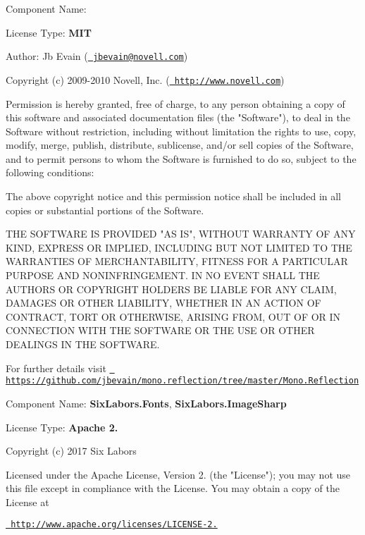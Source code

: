 

Component Name\+: {\bfseries{}}

License Type\+: {\bfseries{MIT}}

Author\+: Jb Evain (\href{mailto:jbevain@novell.com}{\texttt{ jbevain@novell.\+com}})

Copyright (c) 2009-\/2010 Novell, Inc. (\href{http://www.novell.com}{\texttt{ http\+://www.\+novell.\+com}})

Permission is hereby granted, free of charge, to any person obtaining a copy of this software and associated documentation files (the "{}\+Software"{}), to deal in the Software without restriction, including without limitation the rights to use, copy, modify, merge, publish, distribute, sublicense, and/or sell copies of the Software, and to permit persons to whom the Software is furnished to do so, subject to the following conditions\+:

The above copyright notice and this permission notice shall be included in all copies or substantial portions of the Software.

THE SOFTWARE IS PROVIDED "{}\+AS IS"{}, WITHOUT WARRANTY OF ANY KIND, EXPRESS OR IMPLIED, INCLUDING BUT NOT LIMITED TO THE WARRANTIES OF MERCHANTABILITY, FITNESS FOR A PARTICULAR PURPOSE AND NONINFRINGEMENT. IN NO EVENT SHALL THE AUTHORS OR COPYRIGHT HOLDERS BE LIABLE FOR ANY CLAIM, DAMAGES OR OTHER LIABILITY, WHETHER IN AN ACTION OF CONTRACT, TORT OR OTHERWISE, ARISING FROM, OUT OF OR IN CONNECTION WITH THE SOFTWARE OR THE USE OR OTHER DEALINGS IN THE SOFTWARE.

For further details visit \href{https://github.com/jbevain/mono.reflection/tree/master/Mono.Reflection}{\texttt{ https\+://github.\+com/jbevain/mono.\+reflection/tree/master/\+Mono.\+Reflection}}



Component Name\+: {\bfseries{Six\+Labors.\+Fonts}}, {\bfseries{Six\+Labors.\+Image\+Sharp}}

License Type\+: {\bfseries{Apache 2.}}

Copyright (c) 2017 Six Labors

Licensed under the Apache License, Version 2. (the "{}\+License"{}); you may not use this file except in compliance with the License. You may obtain a copy of the License at

\href{http://www.apache.org/licenses/LICENSE-2.0}{\texttt{ http\+://www.\+apache.\+org/licenses/\+LICENSE-\/2.}}

